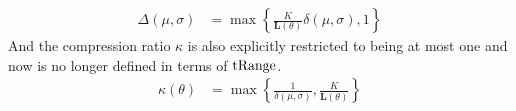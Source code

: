 \begin{equation}\label{eq:newGradient}
\begin{aligned}
\Delta(\mu,\sigma) %
&= \max\left\{ \frac{K}{\mathbf{L}(\theta)}   \delta(\mu,\sigma) , 1 \right\}
\end{aligned}
\end{equation}
And the compression ratio $\kappa$ is also explicitly restricted to being at most one and now is no longer defined in terms of $\text{tRange}$.
\begin{equation}\label{eq:newCompressionRatio}
\begin{aligned}
\kappa(\theta) &= \max\left\{ \frac{1}{\delta(\mu,\sigma) }   , \frac{K}{\mathbf{L}(\theta)} \right\}   
\end{aligned}
\end{equation}



